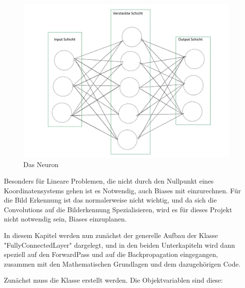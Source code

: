 \documentclass[12pt]{article}
\begin{document}
\begin{figure}[H]
\centering
\includegraphics[scale=0.50]{./Images/BA_002_FeedForwardNetzwerk.jpg}
\caption{Das Neuron}
\label{Was kommt hier rein?}
\end{figure}

Besonders für Lineare Problemen, die nicht durch den Nullpunkt eines Koordinatensystems gehen ist es Notwendig, auch Biases mit einzurechnen. Für die Bild Erkennung ist das normalerweise nicht wichtig, und da sich die Convolutions auf die Bilderkennung Spezialisieren, wird es für dieses Projekt nicht notwendig sein, Biases einzuplanen.

In diesem Kapitel werden nun zunächst der generelle Aufbau der Klasse "FullyConnectedLayer" dargelegt, und in den beiden Unterkapiteln wird dann speziell auf den ForwardPass und auf die Backpropagation eingegangen, zusammen mit den Mathematischen Grundlagen und dem dazugehörigen Code.

Zunächst muss die Klasse erstellt werden. Die Objektvariablen sind diese:
    
\end{document}
